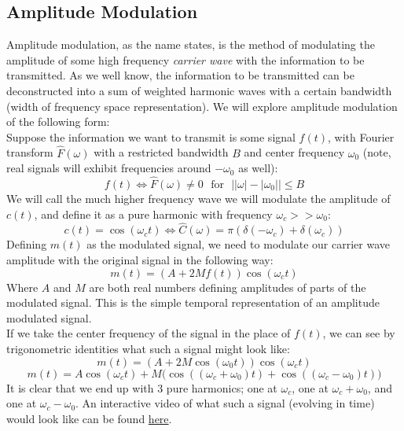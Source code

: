 \documentclass[a4paper]{article}
\numberwithin{equation}{section}
\begin{document}
\subsection{Amplitude Modulation}
Amplitude modulation, as the name states, is the method of modulating the amplitude of some high frequency \textit{carrier wave} with the information to be transmitted. As we well know, the information to be transmitted can be deconstructed into a sum of weighted harmonic waves with a certain bandwidth (width of frequency space representation). We will explore amplitude modulation of the following form:\\

Suppose the information we want to transmit is some signal $f(t)$, with Fourier transform $\hat{F}(\omega)$ with a restricted bandwidth $B$  and center frequency $\omega_0$ (note, real signals will exhibit frequencies around $-\omega_0$ as well):
\begin{equation}
f(t) \Longleftrightarrow \hat{F}(\omega) \neq 0 \: \: \: \text{for} \: \: \: \big| |\omega| - |\omega_0| \big| \leq B
\end{equation}
We will call the much higher frequency wave we will modulate the amplitude of $c(t)$, and define it as a pure harmonic with frequency $\omega_c >> \omega_0$:
\begin{equation}
c(t)=\cos{(\omega_c t)} \Longleftrightarrow \hat{C}(\omega) = \pi(\delta(-\omega_c)+\delta(\omega_c))
\end{equation}
Defining $m(t)$ as the modulated signal, we need to modulate our carrier wave amplitude with the original signal in the following way:
\begin{equation}
m(t)=(A+2Mf(t))\cos{(\omega_c t)}
\end{equation}
Where $A$ and $M$ are both real numbers defining amplitudes of parts of the modulated signal. This is the simple temporal representation of an amplitude modulated signal. \\

If we take the center frequency of the signal in the place of $f(t)$, we can see by trigonometric identities what such a signal might look like:
\begin{equation}
m(t)=(A+2M\cos{(\omega_0t)})\cos{(\omega_c t)}
\end{equation}
\begin{equation}
m(t)=A\cos{(\omega_c t)}+M\big(\cos{((\omega_c+\omega_0)t)}+\cos{((\omega_c-\omega_0)t)} \big)
\end{equation}
It is clear that we end up with 3 pure harmonics; one at $\omega_c$, one at $\omega_c+\omega_0$, and one at $\omega_c-\omega_0$. An interactive video of what such a signal (evolving in time) would look like can be found \href{https://www.desmos.com/calculator/yduhltwoub}{here}. \\
\end{document}
